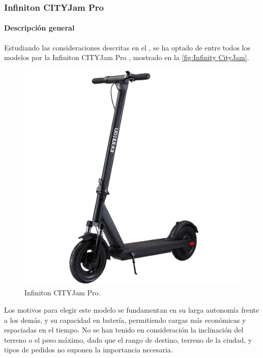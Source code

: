 \subsubsection{Infiniton CITYJam Pro}
\label{apartado_patinetes}
\paragraph{Descripción general}

Estudiando las consideraciones descritas en el , se ha optado de entre todos los modelos por la Infiniton CITYJam Pro \cite{infinitoncityjam}, mostrado en la \autoref{fig:Infinity CityJam}.

\begin{figure}[h]
    \centering
    \includegraphics[scale = 0.2]{archivos/cityjam-pro-negro.jpg}
    \caption{Infiniton CITYJam Pro.}
    \label{fig:Infinity CityJam}
\end{figure}

Los motivos para elegir este modelo se fundamentan en su larga autonomía frente a los demás, y su capacidad en batería, permitiendo cargas más económicas y espaciadas en el tiempo. No se han tenido en consideración la inclinación del terreno o el peso máximo, dado que el rango de destino, terreno de la ciudad, y tipos de pedidos no suponen la  importancia necesaria.

